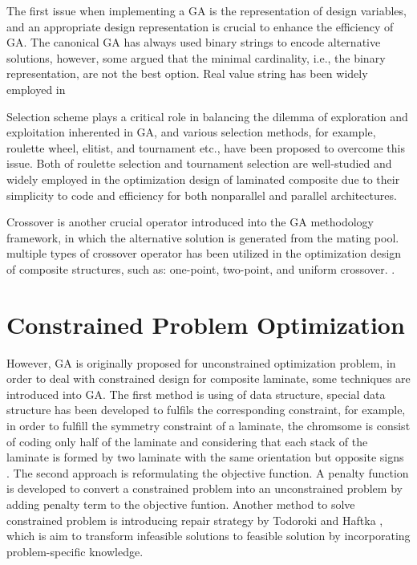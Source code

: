 

The first issue when implementing a GA is the representation of design
variables, and an appropriate design representation is crucial to enhance the
efficiency of GA. The canonical GA has always used binary strings to encode
alternative solutions, however, some argued that the minimal cardinality, i.e.,
the binary representation, are not the best option. Real value string has been
widely employed in 

Selection scheme plays a critical role in balancing the dilemma of exploration
and exploitation inherented in GA, and various selection methods, for example,
roulette wheel, elitist, and tournament etc., have been proposed to overcome
this issue. Both of roulette selection and tournament selection are well-studied
and widely employed in the optimization design of laminated composite due to
their simplicity to code and efficiency for both nonparallel and parallel
architectures.

Crossover is another crucial operator introduced into the GA
methodology framework, in which the alternative solution is generated from the
mating pool.  multiple types of crossover operator has been utilized in the optimization
design of composite structures, such as: one-point, two-point, and uniform
crossover.
.

\section{Constrained Problem Optimization}
However, GA is originally proposed for unconstrained optimization problem, in
order to deal with constrained design for composite laminate, some techniques
are introduced into GA. The first method is using of data structure, special
data structure has been developed to fulfils the corresponding constraint, for
example, in order to fulfill the symmetry constraint of a laminate, the
chromsome is consist of coding only half of the laminate and considering that
each stack of the laminate is formed by two laminate with the same orientation
but opposite signs \cite{le1995improved,kogiso1994design}. The second approach
is reformulating the objective function.  A penalty function is developed to
convert a constrained problem into an unconstrained problem by adding penalty
term to the objective funtion. Another method to solve constrained problem is
introducing repair strategy by Todoroki and Haftka \cite{todoroki1998stacking},
which is aim to transform infeasible solutions to feasible solution by
incorporating problem-specific knowledge. 



